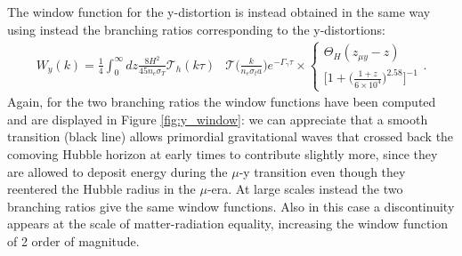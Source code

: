 The window function for the y-distortion is instead obtained in the same way using instead the branching ratios corresponding to the y-distortions:
\begin{align*}
    W_y(k)=\frac14\int_{0}^\infty dz\frac{8H^2}{45 n_e\sigma_T}\mathcal T_h(k\tau)&\mathcal T\Big(\tfrac{k}{n_e\sigma_ta}\Big)e^{-\Gamma_\gamma\tau}\times
    \begin{cases}
        \Theta_H(z_{\mu y}-z)\\
        \bigg[1+\big(\frac{1+z}{6\times10^{4}}\big)^{2.58}\bigg]^{-1}
    \end{cases}.
\end{align*}
Again, for the two branching ratios the window functions have been computed and are displayed in Figure \ref{fig:y_window}: we can appreciate that a smooth transition (black line) allows primordial gravitational waves that crossed back the comoving Hubble horizon at early times to contribute slightly more, since they are allowed to deposit energy during the $\mu$-y transition even though they reentered the Hubble radius in the $\mu$-era. At large scales instead the two branching ratios give the same window functions. Also in this case a discontinuity appears at the scale of matter-radiation equality, increasing the window function of 2 order of magnitude.  

